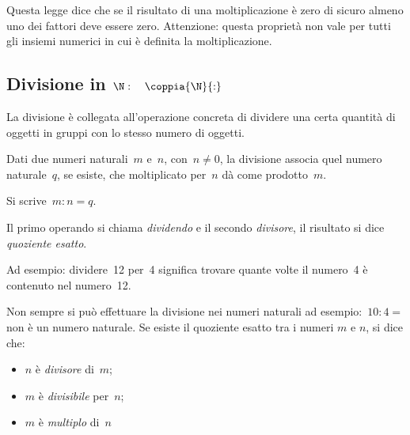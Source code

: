 Questa legge dice che se il risultato di una moltiplicazione è zero di 
sicuro almeno uno dei fattori deve essere zero. Attenzione: questa proprietà 
non vale per tutti gli insiemi numerici in cui è definita la 
moltiplicazione.

\subsection{Divisione in $\N: \quad \coppia{\N}{:}$}

La divisione è collegata all'operazione concreta di dividere una certa
quantità di oggetti in gruppi con lo stesso numero di oggetti.

\begin{definizione}{}{}
Dati due numeri naturali~\(m\) e~\(n\), con~\(n \neq 0\), la divisione 
associa quel numero naturale~\(q\), se esiste, che moltiplicato per~\(n\) 
dà come prodotto~\(m\).

Si scrive~\(m : n = q\).

Il primo operando si chiama \emph{dividendo} e il secondo \emph{divisore}, 
il risultato si dice \emph{quoziente esatto}.
\end{definizione}

Ad esempio: dividere~12 per~4 significa trovare quante volte il numero~4 è 
contenuto nel numero~12.


Non sempre si può effettuare la divisione nei numeri naturali ad 
esempio:~\(10 : 4 =\) non è un numero naturale.
Se esiste il quoziente esatto tra i numeri \(m\) e \(n\), si dice che:

\begin{multicols}{3}
\begin{itemize} [noitemsep]
 \item \(n\) è \emph{divisore} di~\(m\);
 \item \(m\) è \emph{divisibile} per~\(n\);
 \item \(m\) è \emph{multiplo} di~\(n\)
\end{itemize}
\end{multicols}


